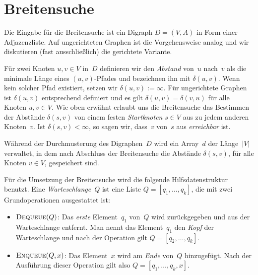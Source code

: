 \section{Breitensuche}


\begin{bem}
Die Eingabe für die Breitensuche ist ein Digraph $D=(V,A)$ in Form einer Adjazenzliste.
Auf ungerichteten Graphen ist die Vorgehensweise analog und wir diskutieren (fast ausschließlich) die gerichtete Variante.
\end{bem}

\begin{defn}
Für zwei Knoten $u,v \in V$ in~$D$ definieren wir den \emph{Abstand} von~$u$ nach~$v$ als die minimale Länge eines $(u,v)$-Pfades und bezeichnen ihn mit $\delta(u,v)$.
Wenn kein solcher Pfad existiert, setzen wir $\delta(u,v):=\infty$.
Für ungerichtete Graphen ist $\delta(u,v)$ entsprechend definiert und es gilt $\delta(u,v)=\delta(v,u)$ für alle Knoten $u,v \in V$.
Wie oben erwähnt erlaubt uns die Breitensuche das Bestimmen der Abstände $\delta(s,v)$ von einem festen \emph{Startknoten} $s \in V$ aus zu jedem anderen Knoten~$v$.
Ist $\delta(s,v) < \infty$, so sagen wir, dass~$v$ von~$s$ aus \emph{erreichbar} ist.
\end{defn} 

\begin{bem} 
Während der Durchmusterung des Digraphen~$D$ wird ein Array~$d$ der Länge~$|V|$ verwaltet, in dem nach Abschluss der Breitensuche die Abstände $\delta(s,v)$, für alle Knoten $v \in V$, gespeichert sind.
\end{bem} 

\begin{defn} 
Für die Umsetzung der Breitensuche wird die folgende Hilfsdatenstruktur benutzt.
Eine \emph{Warteschlange}~$Q$ ist eine Liste $Q=[q_1,\ldots,q_k]$, die mit zwei Grundoperationen ausgestattet ist:
\begin{itemize}
 \item $\mathop{\text{\textsc{Dequeue}}}(Q)$: Das \emph{erste} Element~$q_1$ von~$Q$ wird zurückgegeben und aus der Warteschlange entfernt.
 Man nennt das Element~$q_1$ den \emph{Kopf} der Warteschlange und nach der Operation gilt $Q=[q_2,\ldots,q_k]$.

 \item $\mathop{\text{\textsc{Enqueue}}}(Q,x)$: Das Element~$x$ wird am \emph{Ende} von~$Q$ hinzugefügt.
 Nach der Ausführung dieser Operation gilt also $Q=[q_1,\ldots,q_k,x]$. 
\end{itemize}
\end{defn} 

